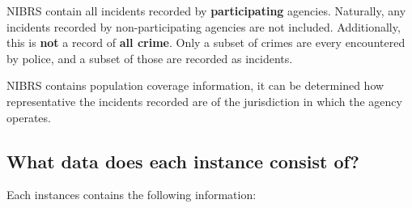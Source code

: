 \documentclass[letterpaper, 10 pt, conference]{ieeeconf}  %
\begin{document}
NIBRS contain all incidents recorded by \textbf{participating} agencies. Naturally, any incidents recorded by non-participating agencies are not included. Additionally, this is \textbf{not} a record of \textbf{all crime}. Only a subset of crimes are every encountered by police, and a subset of those are recorded as incidents. 

NIBRS contains population coverage information, it can be determined how representative the incidents recorded are of the jurisdiction in which the agency operates.

\subsection{What data does each instance consist of?}

Each instances contains the following information: 
\end{document}
